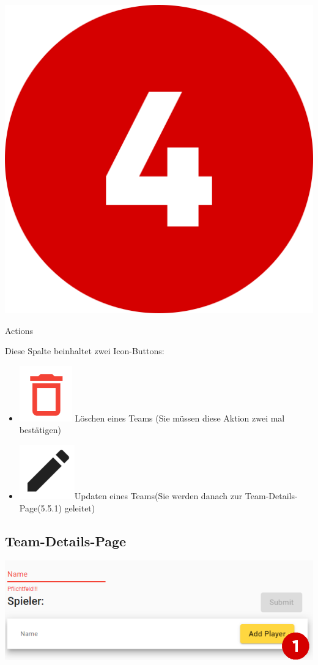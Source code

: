 \bigskip
\includegraphics[scale=0.05]{pics/user-guide/numbers/number-4.png} \begin{LARGE} Actions \end{LARGE}

Diese Spalte beinhaltet zwei Icon-Buttons:
\begin{itemize}
    \item \includegraphics[scale=0.3]{pics/user-guide/delete-icon.PNG} Löschen eines Teams (Sie müssen diese Aktion zwei mal bestätigen)
    \item \includegraphics[scale=0.3]{pics/user-guide/edit-icon.PNG}Updaten eines Teams(Sie werden danach zur Team-Details-Page(5.5.1) geleitet)
\end{itemize}

\bigskip
\subsection{Team-Details-Page}
\includegraphics[scale=0.5]{pics/user-guide/team-create-page.PNG}


